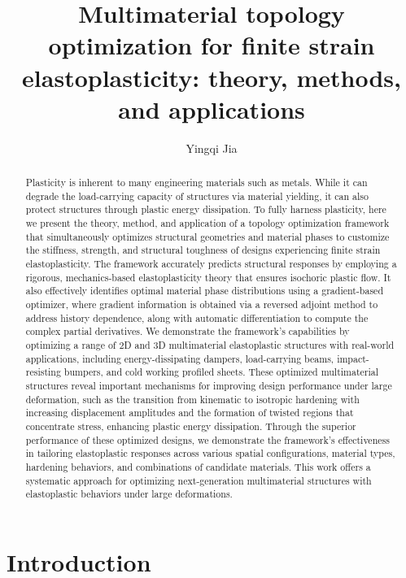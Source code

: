 \documentclass[preprint,11pt]{elsarticle}
\title{Multimaterial topology optimization for finite strain elastoplasticity: theory, methods, and applications}
\author[1]{Yingqi Jia}
\author[1,2,3]{Xiaojia Shelly Zhang\texorpdfstring{\corref{corr-author}}}
\theoremstyle{definition}
\begin{document}
\begin{abstract}
Plasticity is inherent to many engineering materials such as metals. While it can degrade the load-carrying capacity of structures via material yielding, it can also protect structures through plastic energy dissipation. To fully harness plasticity, here we present the theory, method, and application of a topology optimization framework that simultaneously optimizes structural geometries and material phases to customize the stiffness, strength, and structural toughness of designs experiencing finite strain elastoplasticity. The framework accurately predicts structural responses by employing a rigorous, mechanics-based elastoplasticity theory that ensures isochoric plastic flow. It also effectively identifies optimal material phase distributions using a gradient-based optimizer, where gradient information is obtained via a reversed adjoint method to address history dependence, along with automatic differentiation to compute the complex partial derivatives. We demonstrate the framework's capabilities by optimizing a range of 2D and 3D multimaterial elastoplastic structures with real-world applications, including energy-dissipating dampers, load-carrying beams, impact-resisting bumpers, and cold working profiled sheets. These optimized multimaterial structures reveal important mechanisms for improving design performance under large deformation, such as the transition from kinematic to isotropic hardening with increasing displacement amplitudes and the formation of twisted regions that concentrate stress, enhancing plastic energy dissipation. Through the superior performance of these optimized designs, we demonstrate the framework’s effectiveness in tailoring elastoplastic responses across various spatial configurations, material types, hardening behaviors, and combinations of candidate materials. This work offers a systematic approach for optimizing next-generation multimaterial structures with elastoplastic behaviors under large deformations.

\endkeyword
\end{abstract}

\maketitle


\section{Introduction}
\end{document}
